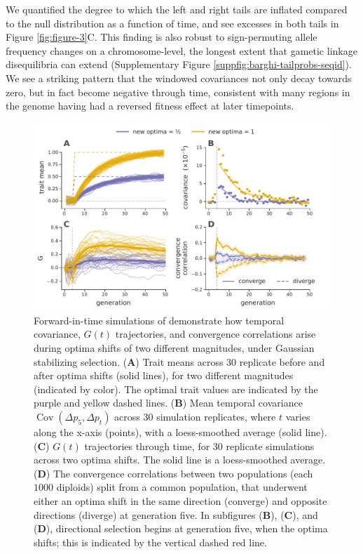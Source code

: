 \documentclass[11pt]{article}
\DeclareMathOperator{\cov}{Cov}
\begin{document}
We quantified the degree to which the left and
right tails are inflated compared to the null distribution as a function of
time, and see excesses in both tails in Figure \ref{fig:figure-3}C. This
finding is also robust to sign-permuting allele frequency changes on a
chromosome-level, the longest extent that gametic linkage disequilibria can
extend (Supplementary Figure \ref{suppfig:barghi-tailprobs-seqid}). We see a
striking pattern that the windowed covariances not only decay towards zero, but
in fact become negative through time, consistent with many regions in the
genome having had a reversed fitness effect at later timepoints.

\begin{figure}[!htb]
  \centering
  \includegraphics[width=\textwidth]{figure-4-edited.pdf}

  \caption{Forward-in-time simulations of demonstrate how temporal covariance,
    $G(t)$ trajectories, and convergence correlations arise during optima
    shifts of two different magnitudes, under Gaussian stabilizing selection.
    ({\bf A}) Trait means across 30 replicate before and after optima shifts (solid
    lines), for two different magnitudes (indicated by color). The optimal
    trait values are indicated by the purple and yellow dashed lines.  ({\bf B}) Mean
    temporal covariance $\cov(\Delta p_5, \Delta p_t)$ across 30 simulation
    replicates, where $t$ varies along the x-axis (points), with a
    loess-smoothed average (solid line). ({\bf C}) $G(t)$ trajectories through time,
    for 30 replicate simulations across two optima shifts. The solid line is a
    loess-smoothed average. ({\bf D}) The convergence correlations between two
    populations (each $1000$ diploids) split from a common population, that
    underwent either an optima shift in the same direction (converge) and
    opposite directions (diverge) at generation five. In subfigures ({\bf B}), ({\bf C}),
    and ({\bf D}), directional selection begins at generation five, when the optima
    shifts; this is indicated by the vertical dashed red line.}

  \label{fig:figure-4}
\end{figure}
\end{document}

